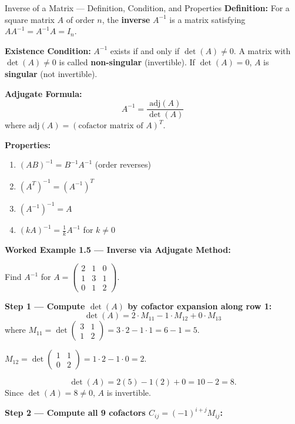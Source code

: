 \documentclass[12pt,a4paper]{article}
\begin{document}
\begin{infobox}{Inverse of a Matrix --- Definition, Condition, and Properties}
\textbf{Definition:} For a square matrix $A$ of order $n$, the \textbf{inverse} $A^{-1}$ is a matrix satisfying $A A^{-1} = A^{-1} A = I_n$.

\textbf{Existence Condition:} $A^{-1}$ exists if and only if $\det(A) \neq 0$. A matrix with $\det(A) \neq 0$ is called \textbf{non-singular} (invertible). If $\det(A) = 0$, $A$ is \textbf{singular} (not invertible).

\textbf{Adjugate Formula:}
\[
A^{-1} = \frac{\text{adj}(A)}{\det(A)}
\]
where $\text{adj}(A) = (\text{cofactor matrix of } A)^T$.

\textbf{Properties:}
\begin{enumerate}[label=(\roman*)]
  \item $(AB)^{-1} = B^{-1} A^{-1}$ \quad (order reverses)
  \item $(A^T)^{-1} = (A^{-1})^T$
  \item $(A^{-1})^{-1} = A$
  \item $(kA)^{-1} = \frac{1}{k} A^{-1}$ for $k \neq 0$
\end{enumerate}
\end{infobox}

\textbf{Worked Example 1.5 --- Inverse via Adjugate Method:}

Find $A^{-1}$ for $A = \begin{pmatrix} 2 & 1 & 0 \\ 1 & 3 & 1 \\ 0 & 1 & 2 \end{pmatrix}$.

\textbf{Step 1 --- Compute $\det(A)$ by cofactor expansion along row 1:}
\[
\det(A) = 2 \cdot M_{11} - 1 \cdot M_{12} + 0 \cdot M_{13}
\]
where $M_{11} = \det\begin{pmatrix} 3 & 1 \\ 1 & 2 \end{pmatrix} = 3\cdot2 - 1\cdot1 = 6 - 1 = 5$.

$M_{12} = \det\begin{pmatrix} 1 & 1 \\ 0 & 2 \end{pmatrix} = 1\cdot2 - 1\cdot0 = 2$.

\[
\det(A) = 2(5) - 1(2) + 0 = 10 - 2 = 8.
\]
Since $\det(A) = 8 \neq 0$, $A$ is invertible.

\textbf{Step 2 --- Compute all 9 cofactors $C_{ij} = (-1)^{i+j} M_{ij}$:}
\end{document}
